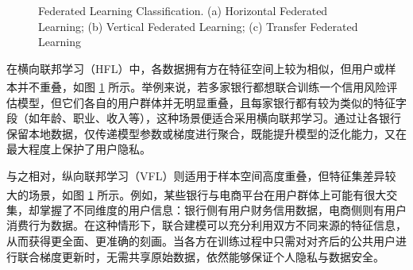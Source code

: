 \vspace{-0.1cm}
\begin{figure}[!h]
	\centering
	\hspace{0.01\textwidth}
	\hspace{0.01\textwidth}
	{\centering \wuhao Federated Learning Classification. (a) Horizontal Federated Learning; (b) Vertical Federated Learning; (c) Transfer Federated Learning}	
	\label{FedClass}
\end{figure}
\vspace{-0.35cm}
在横向联邦学习（HFL）中，各数据拥有方在特征空间上较为相似，但用户或样本并不重叠\textsuperscript{\cite{yang2019federated,liu2019communication}}，如图 \ref{FedClass} 所示。举例来说，若多家银行都想联合训练一个信用风险评估模型，但它们各自的用户群体并无明显重叠，且每家银行都有较为类似的特征字段（如年龄、职业、收入等），这种场景便适合采用横向联邦学习。通过让各银行保留本地数据，仅传递模型参数或梯度进行聚合，既能提升模型的泛化能力，又在最大程度上保护了用户隐私。

与之相对，纵向联邦学习（VFL）则适用于样本空间高度重叠，但特征集差异较大的场景\textsuperscript{\cite{liu2020secure,chen2020vafl}}，如图 \ref{FedClass} 所示。例如，某些银行与电商平台在用户群体上可能有很大交集，却掌握了不同维度的用户信息：银行侧有用户财务信用数据，电商侧则有用户消费行为数据。在这种情形下，联合建模可以充分利用双方不同来源的特征信息，从而获得更全面、更准确的刻画。当各方在训练过程中只需对对齐后的公共用户进行联合梯度更新时，无需共享原始数据，依然能够保证个人隐私与数据安全。

